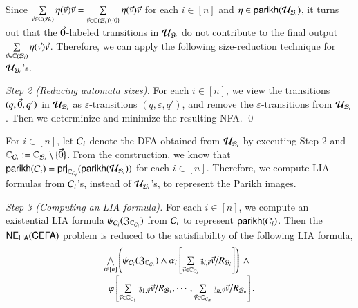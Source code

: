 Since
$\sum \limits_{\vec{v} \in \mathbb{C}(\mathcal{B}_i)} \eta(\vec{v}) \vec{v} = \sum \limits_{\vec{v} \in \mathbb{C}(\mathcal{B}_i) \setminus \{\vec{0}\}} \eta(\vec{v}) \vec{v}$ for each $i \in [n]$ and $\eta \in \mathsf{parikh}(\mathcal{U}_{\mathcal{B}_i})$, it turns out that 
the $\vec{0}$-labeled transitions in $\mathcal{U}_{\mathcal{B}_i}$ do not contribute to the final output $\sum \limits_{\vec{v} \in \mathbb{C}(\mathcal{B}_i)} \eta(\vec{v}) \vec{v}$. Therefore, we can apply the following size-reduction technique for $\mathcal{U}_{\mathcal{B}_i}$'s.

\medskip
\noindent
\emph{Step 2 (Reducing automata sizes).} For each $i \in [n]$, we view the transitions $(q, \vec{0}, q')$ in $\mathcal{U}_{\mathcal{B}_i}$ as $\varepsilon$-transitions $(q, \varepsilon, q')$, and remove the $\varepsilon$-transitions from $\mathcal{U}_{\mathcal{B}_i}$. Then we determinize and minimize the resulting NFA.   \qed

For $i \in [n]$, let  $\mathcal{C}_i$ denote the DFA obtained from $\mathcal{U}_{\mathcal{B}_i}$ by executing Step 2 and $\mathbb{C}_{\mathcal{C}_i} := \mathbb{C}_{\mathcal{B}_i} \setminus \{\vec{0}\}$. From the construction, we know that $\mathsf{parikh}(\mathcal{C}_i) = {\sf prj}_{\mathbb{C}_{\mathcal{C}_i}}(\mathsf{parikh}(\mathcal{U}_{\mathcal{B}_i}))$ for each $i \in [n]$.
Therefore, we compute LIA formulas from $\mathcal{C}_i$'s, instead of $\mathcal{U}_{\mathcal{B}_i}$'s, to represent the Parikh images. 

\medskip
\noindent
\emph{Step 3 (Computing an LIA formula).} For each $i \in [n]$, we compute an existential LIA formula $\psi_{\mathcal{C}_i}(\mathfrak{Z}_{\mathbb{C}_{\mathcal{C}_i}})$ from $\mathcal{C}_i$ to represent $\mathsf{parikh}(\mathcal{C}_i)$. Then the ${\sf NE_{LIA}(CEFA)}$ problem is reduced to the satisfiability of the following LIA formula, 
%
\begin{equation}\label{eq:parikh_image}
\begin{array}{l}
\bigwedge \limits_{i \in [n]} \left(\psi_{\cC_i}(\fZ_{\costset_{\cC_i}}) \wedge \alpha_i\left[\sum\limits_{\myvec{v} \in \costset_{\cC_i}} \anivarz_{i, \myvec{v}} \myvec{v} \big{/}R_{\cB_i}  \right] \right) \ \wedge \\
\ \ \varphi \left[ \sum\limits_{\myvec{v} \in \costset_{\cC_1}} \anivarz_{1, \myvec{v}} \myvec{v} \big{/}R_{\cB_1}, \cdots, \sum\limits_{\myvec{v} \in \costset_{\cC_n}} \anivarz_{n, \myvec{v}} \myvec{v} \big{/}R_{\cB_n} \right].
\end{array}
\end{equation}

